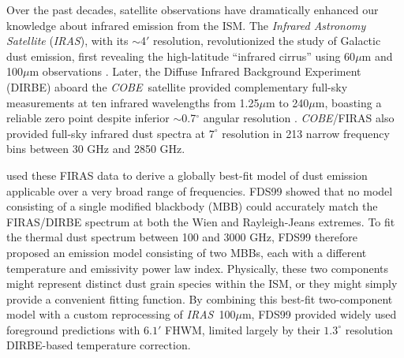 \documentclass{emulateapj}
\newcommand{\IRAS}{{\it IRAS}}
\newcommand{\COBE}{{\it COBE}}
\begin{document}

Over the past decades, satellite observations have dramatically enhanced our
knowledge about infrared emission from the ISM. The \textit{Infrared Astronomy 
Satellite} (\IRAS), with its $\sim$4$'$ resolution, revolutionized the study of
 Galactic dust emission, first revealing the high-latitude ``infrared cirrus'' 
using 60$\mu$m and 100$\mu$m observations \citep{low84, wheelock94}. Later, the
Diffuse Infrared Background Experiment (DIRBE) aboard the \COBE~satellite 
provided complementary full-sky measurements at ten infrared wavelengths from 
1.25$\mu$m to 240$\mu$m, boasting a reliable zero point despite inferior 
$\sim$0.7$^{\circ}$ angular resolution \citep{boggess92}. \COBE/FIRAS 
\citep{firas} also provided full-sky infrared dust spectra at $7^{\circ}$ 
resolution in 213 narrow frequency bins between 30 GHz and 2850 GHz.


\citet[hereafter FDS99]{FDS99} used these FIRAS data to derive a globally 
best-fit model of dust emission applicable over a very broad range of 
frequencies. FDS99 showed that no model consisting of a single modified 
blackbody (MBB) could accurately match the FIRAS/DIRBE spectrum at both the 
Wien and Rayleigh-Jeans extremes. To fit the thermal dust spectrum between 100 
and 3000 GHz, FDS99 therefore proposed an emission model consisting of two 
MBBs, each with a different temperature and emissivity power law index. 
Physically, these two components might represent distinct dust grain species 
within the ISM, or they might simply provide a convenient fitting function. By 
combining this best-fit two-component model with a custom reprocessing of 
\IRAS~100$\mu$m, FDS99 provided widely used foreground predictions with $6.1'$ 
FHWM, limited largely by their $1.3^{\circ}$ resolution DIRBE-based temperature
correction.

\end{document}
